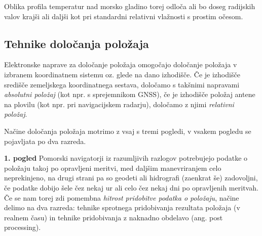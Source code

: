 Oblika profila temperatur nad morsko gladino torej odloča ali bo doseg radijskih valov krajši ali daljši kot pri standardni relativni vlažnosti s prostim očesom. 


\subsection{Tehnike določanja položaja}
\label{SubSec:TehnDolPoloz}

Elektronske naprave za določanje položaja omogočajo določanje položaja v izbranem koordinatnem sistemu oz. glede na dano izhodišče. Če je izhodišče središče zemeljskega koordinatnega sestava, določamo s takšnimi napravami \textit{absolutni položaj} (kot npr. s sprejemnikom GNSS), če je izhodišče položaj antene na plovilu (kot npr. pri navigacijskem radarju), določamo z njimi \textit{relativni položaj}. 

Načine določanja položaja motrimo z vsaj s tremi pogledi, v vsakem pogledu se pojavljata po dva razreda. 

\textbf{1. pogled} Pomorski navigatorji iz razumljivih razlogov potrebujejo podatke o položaju takoj po opravljeni meritvi, med daljšim manevriranjem celo neprekinjeno, na drugi strani pa so geodeti ali hidrografi (zaenkrat še) zadovoljni, če podatke dobijo šele čez nekaj ur ali celo čez nekaj dni po opravljenih meritvah. Če se nam torej zdi pomembna \textit{hitrost pridobitve podatka o položaju}, načine delimo na dva razreda: tehnike sprotnega pridobivanja rezultata položaja (v realnem času) in tehnike pridobivanja z naknadno obdelavo (ang. post processing).      

